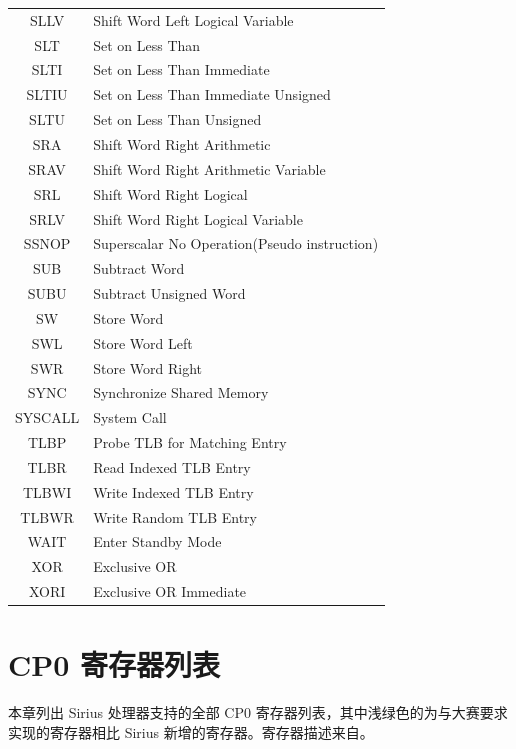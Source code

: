 \documentclass[blue,normal,cn,hide]{elegantbook}
\begin{document}
\begin{longtable}[c]{| c | l |}
    SLLV & Shift Word Left Logical Variable \\
    SLT & Set on Less Than \\
    SLTI & Set on Less Than Immediate \\
    SLTIU & Set on Less Than Immediate Unsigned \\
    SLTU & Set on Less Than Unsigned \\
    SRA & Shift Word Right Arithmetic \\
    SRAV & Shift Word Right Arithmetic Variable \\
    SRL & Shift Word Right Logical \\
    SRLV & Shift Word Right Logical Variable \\
    SSNOP & Superscalar No Operation(Pseudo instruction) \\
    SUB & Subtract Word \\
    SUBU & Subtract Unsigned Word \\
    SW & Store Word \\
    \rowcolor{green!20} SWL & Store Word Left \\
    \rowcolor{green!20} SWR & Store Word Right \\
    \rowcolor{green!20} SYNC & Synchronize Shared Memory \\
    SYSCALL & System Call \\
    \rowcolor{green!20} TLBP & Probe TLB for Matching Entry \\
    \rowcolor{green!20} TLBR & Read Indexed TLB Entry \\
    \rowcolor{green!20} TLBWI & Write Indexed TLB Entry \\
    \rowcolor{green!20} TLBWR & Write Random TLB Entry \\
    \rowcolor{green!20} WAIT & Enter Standby Mode \\
    XOR & Exclusive OR \\
    XORI & Exclusive OR Immediate \\
    \end{longtable}

\section{CP0 寄存器列表}
本章列出 Sirius 处理器支持的全部 CP0 寄存器列表，其中浅绿色的为与大赛要求实现的寄存器相比
 Sirius 新增的寄存器。寄存器描述来自\cite{MIPS3}。
\end{document}
